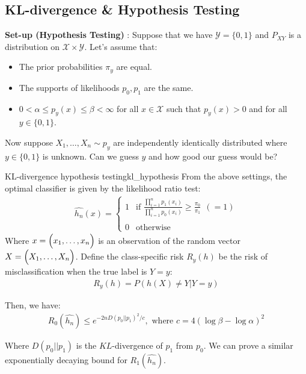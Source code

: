 \subsection{KL-divergence \& Hypothesis Testing}
\textbf{Set-up (Hypothesis Testing)} : Suppose that we have $\mathcal{Y}=\{0,1\}$ and $P_{XY}$ is a distribution on $\mathcal{X}\times\mathcal{Y}$. Let's assume that:
\begin{itemize}
    \item The prior probabilities $\pi_y$ are equal.
    \item The supports of likelihoods $p_0,p_1$ are the same.
    \item $0 < \alpha \le p_y(x) \le \beta < \infty$ for all $x\in \mathcal{X}$ such that $p_y(x)>0$ and for all $y\in\{0,1\}$.
\end{itemize}

\noindent Now suppose $X_1, \dots, X_n \sim p_y$ are independently identically distributed where $y\in\{0,1\}$ is unknown. Can we guess $y$ and how good our guess would be?

\begin{proposition}{KL-divergence hypothesis testing}{kl_hypothesis}
    From the above settings, the optimal classifier is given by the likelihood ratio test:
    \begin{align*}
        \widehat{h_n}(x) = \begin{cases}
            1 &\text{if } \frac{\prod_{i=1}^n p_1(x_i)}{\prod_{i=1}^n p_0(x_i)} \ge \frac{\pi_0}{\pi_1} \ \ (=1)
            \\ \\
            0 &\text{otherwise}
        \end{cases}
    \end{align*}
    \noindent Where $x=\Big( x_1, \dots, x_n \Big)$ is an observation of the random vector $X=\Big( X_1, \dots, X_n \Big)$. Define the class-specific risk $R_y(h)$ be the risk of misclassification when the true label is $Y=y$:
    \begin{align*}
        R_y(h) = P(h(X) \ne Y|Y=y)
    \end{align*}

    \noindent Then, we have:
    \begin{align*}
        R_0(\widehat{h_n}) \le e^{-2n D(p_0||p_1)^2 / c}, \text{ where } c = 4(\log\beta - \log\alpha)^2
    \end{align*}

    \noindent Where $D(p_0||p_1)$ is the $KL$-divergence of $p_1$ from $p_0$. We can prove a similar exponentially decaying bound for $R_1(\widehat{h_n})$.
\end{proposition}

